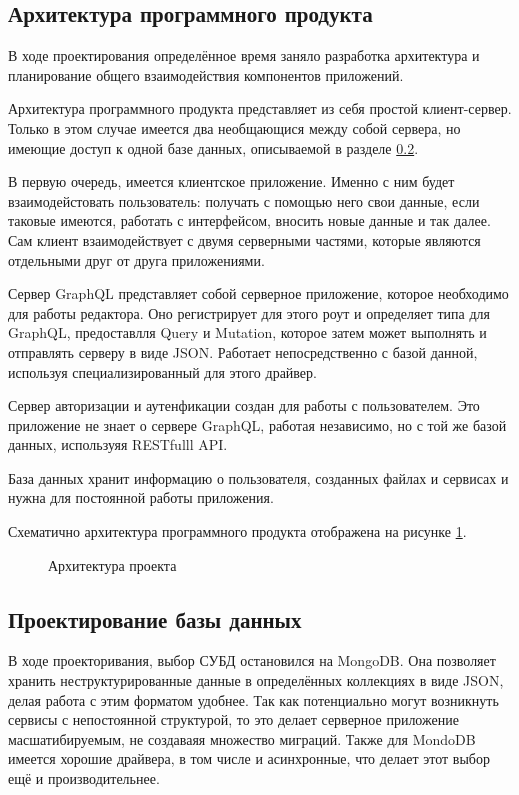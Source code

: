 \subsection{Архитектура программного продукта}

В ходе проектирования определённое время заняло разработка архитектура и планирование общего взаимодействия компонентов приложений.

Архитектура программного продукта представляет из себя простой клиент-сервер. Только в этом случае имеется два необщающися между собой сервера, но имеющие
доступ к одной базе данных, описываемой в разделе \ref{des:bd_section}.

В первую очередь, имеется клиентское приложение. Именно с ним будет взаимодейстовать пользователь: получать с помощью него свои данные, если таковые имеются,
работать с интерфейсом, вносить новые данные и так далее. Сам клиент взаимодействует с двумя серверными частями, которые являются отдельными друг от друга приложениями.

Сервер GraphQL представляет собой серверное приложение, которое необходимо для работы редактора. Оно регистрирует для этого роут и определяет типа для GraphQL, предоставлля
Query и Mutation, которое затем может выполнять и отправлять серверу в виде JSON. Работает непосредственно с базой данной, используя специализированный для этого драйвер.

Сервер авторизации и аутенфикации создан для работы с пользователем. Это приложение не знает о сервере GraphQL, работая независимо, но с той же базой данных, используяя
RESTfulll API.

База данных хранит информацию о пользователя, созданных файлах и сервисах и нужна для постоянной работы приложения.

Схематично архитектура программного продукта отображена на рисунке \ref{des:arch}.

\begin{figure}[H]
    \caption{Архитектура проекта}
    \label{des:arch}
\end{figure}

\subsection{Проектирование базы данных}

\label{des:bd_section}

В ходе проекторивания, выбор СУБД остановился на MongoDB. Она позволяет хранить неструктурированные данные в определённых коллекциях в виде JSON, делая работа с этим форматом удобнее.
Так как потенциально могут возникнуть сервисы с непостоянной структурой, то это делает серверное приложение масшатибируемым, не создаваяя множество миграций. Также для MondoDB имеется
хорошие драйвера, в том числе и асинхронные, что делает этот выбор ещё и производительнее.

